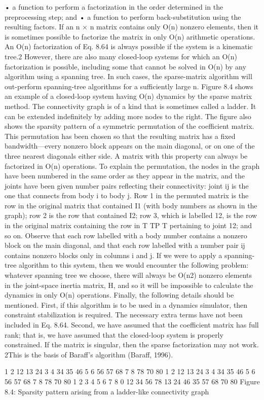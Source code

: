 • a function to perform a factorization in the order determined in the preprocessing step; and • a function to perform back-substitution using the resulting factors. If an n × n matrix contains only O(n) nonzero elements, then it is sometimes possible to factorize the matrix in only O(n) arithmetic operations. An O(n) factorization of Eq. 8.64 is always possible if the system is a kinematic tree.2 However, there are also many closed-loop systems for which an O(n) factorization is possible, including some that cannot be solved in O(n) by any algorithm using a spanning tree. In such cases, the sparse-matrix algorithm will out-perform spanning-tree algorithms for a sufficiently large n. Figure 8.4 shows an example of a closed-loop system having O(n) dynamics by the sparse matrix method. The connectivity graph is of a kind that is sometimes called a ladder. It can be extended indefinitely by adding more nodes to the right. The figure also shows the sparsity pattern of a symmetric permutation of the coefficient matrix. This permutation has been chosen so that the resulting matrix has a fixed bandwidth—every nonzero block appears on the main diagonal, or on one of the three nearest diagonals either side. A matrix with this property can always be factorized in O(n) operations. To explain the permutation, the nodes in the graph have been numbered in the same order as they appear in the matrix, and the joints have been given number pairs reflecting their connectivity: joint ij is the one that connects from body i to body j. Row 1 in the permuted matrix is the row in the original matrix that contained I1 (with body numbers as shown in the graph); row 2 is the row that contained I2; row 3, which is labelled 12, is the row in the original matrix containing the row in T TP T pertaining to joint 12; and so on. Observe that each row labelled with a body number contains a nonzero block on the main diagonal, and that each row labelled with a number pair ij contains nonzero blocks only in columns i and j. If we were to apply a spanning-tree algorithm to this system, then we would encounter the following problem: whatever spanning tree we choose, there will always be O(n2) nonzero elements in the joint-space inertia matrix, H, and so it will be impossible to calculate the dynamics in only O(n) operations. Finally, the following details should be mentioned. First, if this algorithm is to be used in a dynamics simulator, then constraint stabilization is required. The necessary extra terms have not been included in Eq. 8.64. Second, we have assumed that the coefficient matrix has full rank; that is, we have assumed that the closed-loop system is properly constrained. If the matrix is singular, then the sparse factorization may not work. 2This is the basis of Baraff’s algorithm (Baraff, 1996).

1 2 12 13 24 3 4 34 35 46 5 6 56 57 68 7 8 78 70 80 1 2 12 13 24 3 4 34 35 46 5 6 56 57 68 7 8 78 70 80 1 2 3 4 5 6 7 8 0 12 34 56 78 13 24 46 35 57 68 70 80 Figure 8.4: Sparsity pattern arising from a ladder-like connectivity graph
